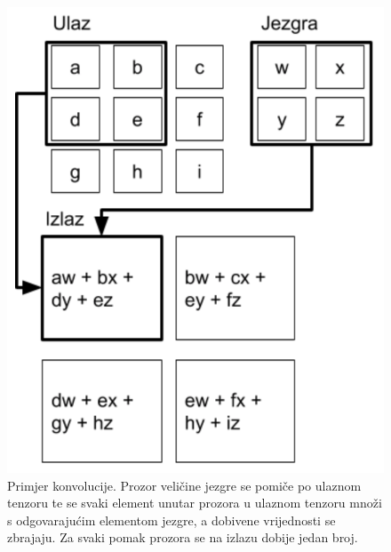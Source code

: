  \begin{figure}
	\centering
	\includegraphics[scale=0.6]{img/konvolucija.png}
	\caption{Primjer konvolucije. Prozor veličine jezgre se pomiče po ulaznom tenzoru te se svaki element unutar prozora u ulaznom tenzoru množi s odgovarajućim elementom jezgre, a dobivene vrijednosti se zbrajaju. Za svaki pomak prozora se na izlazu dobije jedan broj.}
	\label{konvolucija}
\end{figure}

